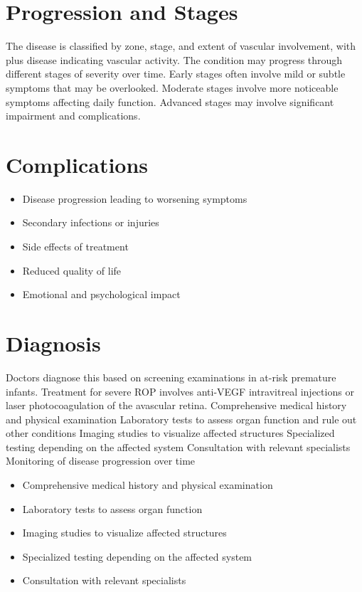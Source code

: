 \section{Progression and Stages}
The disease is classified by zone, stage, and extent of vascular involvement, with plus disease indicating vascular activity. The condition may progress through different stages of severity over time. Early stages often involve mild or subtle symptoms that may be overlooked. Moderate stages involve more noticeable symptoms affecting daily function. Advanced stages may involve significant impairment and complications.
\section{Complications}
\begin{itemize}[noitemsep]
  \item Disease progression leading to worsening symptoms
  \item Secondary infections or injuries
  \item Side effects of treatment
  \item Reduced quality of life
  \item Emotional and psychological impact
\end{itemize}
\section{Diagnosis}
Doctors diagnose this based on screening examinations in at-risk premature infants. Treatment for severe ROP involves anti-VEGF intravitreal injections or laser photocoagulation of the avascular retina. Comprehensive medical history and physical examination Laboratory tests to assess organ function and rule out other conditions Imaging studies to visualize affected structures Specialized testing depending on the affected system Consultation with relevant specialists Monitoring of disease progression over time

\begin{itemize}[noitemsep]
  \item Comprehensive medical history and physical examination
  \item Laboratory tests to assess organ function
  \item Imaging studies to visualize affected structures
  \item Specialized testing depending on the affected system
  \item Consultation with relevant specialists
\end{itemize}
